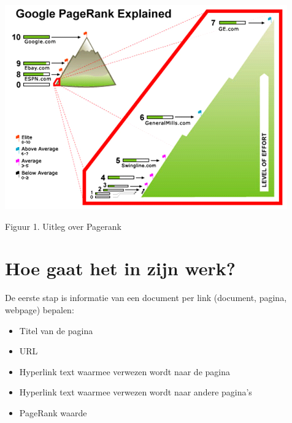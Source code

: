 \documentclass[12pt,a4paper]{article}
\begin{document}
\vspace{1pc}
\includegraphics{GooglePageRankExplained}

Figuur 1. Uitleg over Pagerank \cite{2} 
\clearpage


\section{Hoe gaat het in zijn werk?}
De eerste stap is informatie van een document per link (document, pagina, webpage) bepalen:
\begin{itemize}
\item Titel van de pagina
\item URL
\item Hyperlink text waarmee verwezen wordt naar de pagina
\item Hyperlink text waarmee verwezen wordt naar andere pagina's
\item PageRank waarde
\end{itemize}
\end{document}
